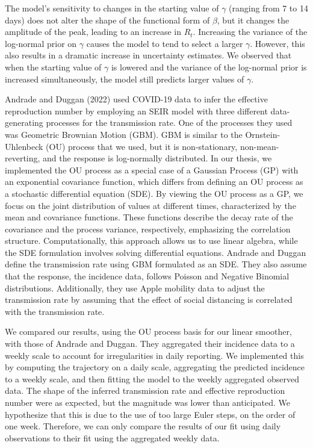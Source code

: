 \documentclass[
11pt, %
oneside, %
english, %
singlespacing, %
]{macthesis} %
\begin{document}
The model's sensitivity to changes in the starting value of \(\gamma\) (ranging from 7 to 14 days) does not alter the shape of the functional form of \(\beta\), but it changes the amplitude of the peak, leading to an increase in \(R_t\). Increasing the variance of the log-normal prior on \(\gamma\) causes the model to tend to select a larger \(\gamma\). However, this also results in a dramatic increase in uncertainty estimates. We observed that when the starting value of \(\gamma\) is lowered and the variance of the log-normal prior is increased simultaneously, the model still predicts larger values of \(\gamma\).

Andrade and Duggan (2022) used COVID-19 data to infer the effective reproduction number by employing an SEIR model with three different data-generating processes for the transmission rate. One of the processes they used was Geometric Brownian Motion (GBM). GBM is similar to the Ornstein-Uhlenbeck (OU) process that we used, but it is non-stationary, non-mean-reverting, and the response is log-normally distributed. In our thesis, we implemented the OU process as a special case of a Gaussian Process (GP) with an exponential covariance function, which differs from defining an OU process as a stochastic differential equation (SDE). By viewing the OU process as a GP, we focus on the joint distribution of values at different times, characterized by the mean and covariance functions. These functions describe the decay rate of the covariance and the process variance, respectively, emphasizing the correlation structure. Computationally, this approach allows us to use linear algebra, while the SDE formulation involves solving differential equations. Andrade and Duggan define the transmission rate using GBM formulated as an SDE. They also assume that the response, the incidence data, follows Poisson and Negative Binomial distributions. Additionally, they use Apple mobility data to adjust the transmission rate by assuming that the effect of social distancing is correlated with the transmission rate.

We compared our results, using the OU process basis for our linear smoother, with those of Andrade and Duggan. They aggregated their incidence data to a weekly scale to account for irregularities in daily reporting. We implemented this by computing the trajectory on a daily scale, aggregating the predicted incidence to a weekly scale, and then fitting the model to the weekly aggregated observed data. The shape of the inferred transmission rate and effective reproduction number were as expected, but the magnitude was lower than anticipated. We hypothesize that this is due to the use of too large Euler steps, on the order of one week. Therefore, we can only compare the results of our fit using daily observations to their fit using the aggregated weekly data.
\end{document}
